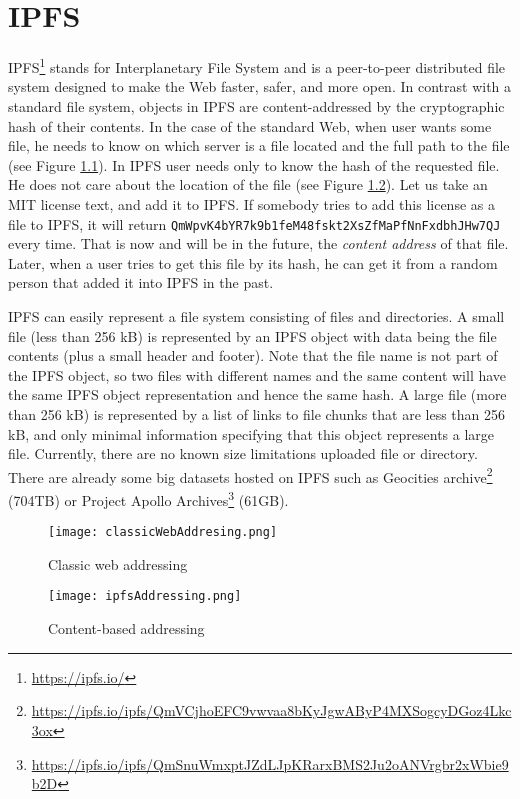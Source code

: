 \chapter{IPFS}
\label{ipfs}

IPFS\footnote{\url{https://ipfs.io/}} stands for Interplanetary File System and is a peer-to-peer distributed file system designed to make the Web faster, safer, and more open. In contrast with a standard file system, objects in IPFS are content-addressed by the cryptographic hash of their contents. In the case of the standard Web, when user wants some file, he needs to know on which server is a file located and the full path to the file (see Figure \ref{webAddressing}). In IPFS user needs only to know the hash of the requested file. He does not care about the location of the file (see Figure \ref{ipfsAddressing}). Let us take an MIT license text, and add it to IPFS. If somebody tries to add this license as a file to IPFS, it will return \texttt{QmWpvK4bYR7k9b1feM48fsk\-t2XsZfMaPfNnFxdbhJHw7QJ} every time. That is now and will be in the future, the \textit{content address} of that file. Later, when a user tries to get this file by its hash, he can get it from a random person that added it into IPFS in the past.

IPFS can easily represent a file system consisting of files and directories. A small file (less than 256 kB) is represented by an IPFS object with data being the file contents (plus a small header and footer). Note that the file name is not part of the IPFS object, so two files with different names and the same content will have the same IPFS object representation and hence the same hash. A large file (more than 256 kB) is represented by a list of links to file chunks that are less than 256 kB, and only minimal information specifying that this object represents a large file. Currently, there are no known size limitations uploaded file or directory. There are already some big datasets hosted on IPFS such as Geocities archive\footnote{\url{https://ipfs.io/ipfs/QmVCjhoEFC9vwvaa8bKyJgwAByP4MXSogcyDGoz4Lkc3ox}} (704TB) or Project Apollo Archives\footnote{\url{https://ipfs.io/ipfs/QmSnuWmxptJZdLJpKRarxBMS2Ju2oANVrgbr2xWbie9b2D}} (61GB).


\begin{figure}[h]
    \centering
    \texttt{[image: classicWebAddresing.png]}
    \caption{Classic web addressing}
    \label{webAddressing}
\end{figure}

\begin{figure}[h]
    \centering
    \texttt{[image: ipfsAddressing.png]}
    \caption{Content-based addressing}
    \label{ipfsAddressing}
\end{figure}

